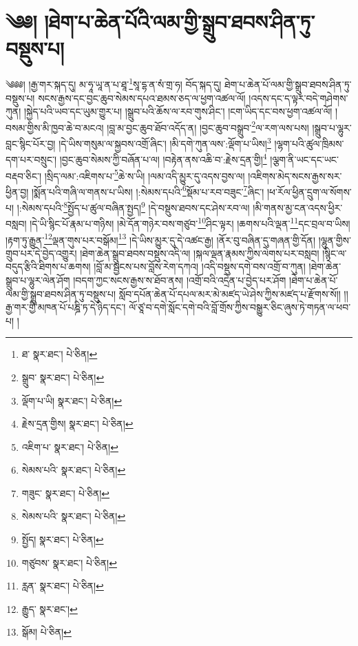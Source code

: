 \setcounter{footnote}{0} 
\chapter{༄༅། །ཐེག་པ་ཆེན་པོའི་ལམ་གྱི་སྒྲུབ་ཐབས་ཤིན་ཏུ་བསྡུས་པ།}༄༅༅། །རྒྱ་གར་སྐད་དུ། མ་ཧཱ་ཡཱ་ན་པ་ཐཱ་\footnote{ཐ་  སྣར་ཐང་།  པེ་ཅིན། }སཱ་དྷ་ན་སཾ་གྲ་ཧ། བོད་སྐད་དུ། ཐེག་པ་ཆེན་པོ་ལམ་གྱི་སྒྲུབ་ཐབས་ཤིན་ཏུ་བསྡུས་པ། སངས་རྒྱས་དང་བྱང་ཆུབ་སེམས་དཔའ་ཐམས་ཅད་ལ་ཕྱག་འཚལ་ལོ། །འདས་དང་ད་ལྟར་བདེ་གཤེགས་ཀུན། །སྐྱེད་པའི་ཡབ་དང་ཡུམ་གྱུར་པ། །སྒྲུབ་པའི་ཆོས་ལ་རབ་གུས་ཤིང་། །ངག་ཡིད་དང་བས་ཕྱག་འཚལ་ལོ། །བསམ་གྱིས་མི་ཁྱབ་ཆེ་བ་མངའ། །བླ་མ་བྱང་ཆུབ་ཐོབ་འདོད་ན། །བྱང་ཆུབ་བསྒྲུབ་\footnote{སྒྲུབ་  སྣར་ཐང་།  པེ་ཅིན། }ལ་རག་ལས་པས། །སྒྲུབ་པ་ལྷུར་བླང་སྙིང་པོར་བྱ། །དེ་ཡིས་གསུམ་ལ་སྐྱབས་འགྲོ་ཞིང་། །མི་དགེ་ཀུན་ལས་:ལྡོག་པ་ཡིས།\footnote{ལྡོག་པ་ཡི།  སྣར་ཐང་།  པེ་ཅིན། } །ལྷག་པའི་ཚུལ་ཁྲིམས་དག་པར་བསྲུང་། །བྱང་ཆུབ་སེམས་ཀྱི་བཞོན་པ་ལ། །བརྟེན་ནས་འཆི་བ་:རྗེས་དྲན་གྱི།\footnote{རྗེས་དྲན་གྱིས།  སྣར་ཐང་།  པེ་ཅིན། } །ལྕག་ནི་ཡང་དང་ཡང་བརྡབ་ཅིང་། །སྲིད་ལམ་:འཇིགས་པ་\footnote{འཇིག་པ་  སྣར་ཐང་།  པེ་ཅིན། }ཆེ་ས་ཡི། །ལམ་འདི་མྱུར་དུ་འདས་བྱས་ལ། །འཇིགས་མེད་སངས་རྒྱས་སར་ཕྱིན་བྱ། །སྨོན་པའི་གཞི་ལ་གནས་པ་ཡིས། །:སེམས་དཔའི་\footnote{སེམས་པའི་  སྣར་ཐང་།  པེ་ཅིན། }སྡོམ་པ་རབ་བཟུང་\footnote{གཟུང་  སྣར་ཐང་།  པེ་ཅིན། }ཞིང་། །ཕ་རོལ་ཕྱིན་དྲུག་ལ་སོགས་པ། །:སེམས་དཔའི་\footnote{སེམས་པའི་  སྣར་ཐང་།  པེ་ཅིན། }སྤྱོད་པ་ཚུལ་བཞིན་སྤྱད།\footnote{སྤྱོད།  སྣར་ཐང་།  པེ་ཅིན། } །དེ་བསྡུས་ཐབས་དང་ཤེས་རབ་ལ། །མི་གནས་མྱ་ངན་འདས་ཕྱིར་བསླབ། །དེ་ཡི་སྙིང་པོ་རྣམ་པ་གཉིས། །མེ་དོན་གཉེར་བས་གཙུབ་\footnote{གཙུབས་  སྣར་ཐང་།  པེ་ཅིན། }ཤིང་ལྟར། །ཆགས་པའི་ལྡན་\footnote{རླན་  སྣར་ཐང་།  པེ་ཅིན། }དང་བྲལ་བ་ཡིས། །རྟག་ཏུ་རྒྱུན་\footnote{རྒྱུད་  སྣར་ཐང་། }ལྡན་གུས་པར་བསྒོམ།\footnote{སྒོམ།  པེ་ཅིན། } །དེ་ཡིས་མྱུར་དུ་དེ་འཚང་རྒྱ། །ནོར་བུ་བཞིན་དུ་གཞན་གྱི་དོན། །ལྷུན་གྱིས་གྲུབ་པར་དེ་བྱེད་འགྱུར། །ཐེག་ཆེན་སྒྲུབ་ཐབས་བསྡུས་འདི་ལ། །སྐལ་ལྡན་རྣམས་ཀྱིས་ལེགས་པར་བསླབ། །སྙིང་ལ་བདུད་རྩིའི་ཐིགས་པ་ཆགས། །བློ་མ་སྦྱངས་པས་བློས་རེག་དཀའ། །འདི་བསྡུས་དགེ་བས་འགྲོ་བ་ཀུན། །ཐེག་ཆེན་སྒྲུབ་པ་ལྷུར་ལེན་ཤོག །བདག་ཀྱང་སངས་རྒྱས་ས་ཐོབ་ནས། །འགྲོ་བའི་འདྲེན་པ་བྱེད་པར་ཤོག །ཐེག་པ་ཆེན་པོ་ལམ་གྱི་སྒྲུབ་ཐབས་ཤིན་ཏུ་བསྡུས་པ། སློབ་དཔོན་ཆེན་པོ་དཔལ་མར་མེ་མཛད་ཡེ་ཤེས་ཀྱིས་མཛད་པ་རྫོགས་སོ།། །།རྒྱ་གར་གྱི་མཁན་པོ་པཎྜི་ཏ་དེ་ཉིད་དང་། ལོ་ཙཱ་བ་དགེ་སློང་དགེ་བའི་བློ་གྲོས་ཀྱིས་བསྒྱུར་ཅིང་ཞུས་ཏེ་གཏན་ལ་ཕབ་པ། ། 